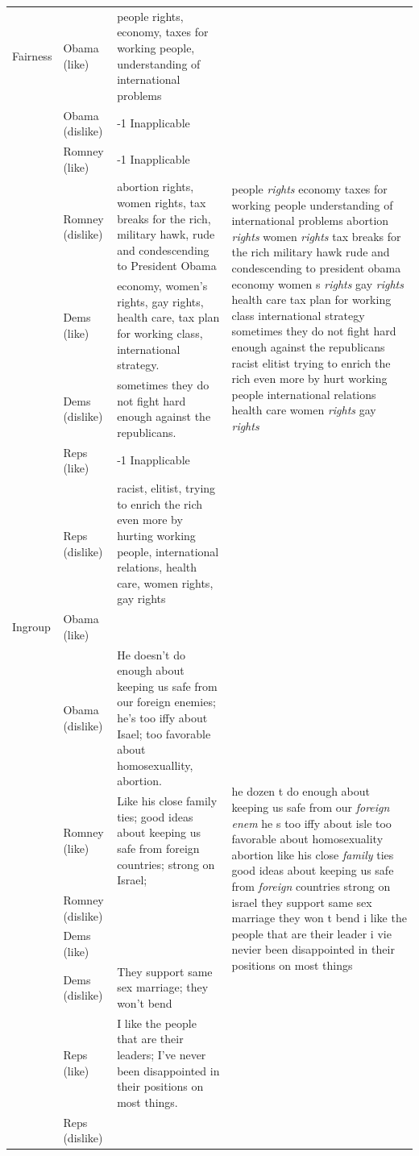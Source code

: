 \documentclass[12pt]{article}
\begin{document}
\begin{center}
\begin{longtable}{lp{1.5cm}p{5.5cm}p{5.5cm}}
	Fairness & Obama (like) & people rights, economy, taxes for working people, understanding of international problems & \multirow{8}{5.5cm}{people \textit{rights} economy taxes for working people understanding of international problems abortion \textit{rights} women \textit{rights} tax breaks for the rich military hawk rude and condescending to president obama economy women s \textit{rights} gay \textit{rights} health care tax plan for working class international strategy sometimes they do not fight hard enough against the republicans racist elitist trying to enrich the rich even more by hurt working people international relations health care women \textit{rights} gay \textit{rights}} \\
	 & Obama (dislike) & -1 Inapplicable \\
	 & Romney (like) & -1 Inapplicable \\
	 & Romney (dislike) & abortion rights, women rights, tax breaks for the rich, military hawk, rude and condescending to President Obama \\
	 & Dems (like) & economy, women's rights, gay rights, health care, tax plan for working class, international strategy. \\
	 & Dems (dislike) & sometimes they do not fight hard enough against the republicans. \\
	 & Reps (like) & -1 Inapplicable \\
	 & Reps (dislike) & racist, elitist, trying to enrich the rich even more by hurting working people, international relations, health care, women rights, gay rights \\ \hline	
	
	Ingroup & Obama (like) &  & \multirow{8}{5.5cm}{he dozen t do enough about keeping us safe from our \textit{foreign} \textit{enem} he s too iffy about isle too favorable about homosexuality abortion like his close \textit{family} ties good ideas about keeping us safe from \textit{foreign} countries strong on israel they support same sex marriage they won t bend i like the people that are their leader i vie nevier been disappointed in their positions on most things} \\
	 & Obama (dislike) & He doesn't do enough about keeping us safe from our foreign enemies; he's too iffy about Isael; too favorable about homosexuallity, abortion. \\
	 & Romney (like) & Like his close family ties; good ideas about keeping us safe from foreign countries; strong on Israel; \\
	 & Romney (dislike) &  \\
	 & Dems (like) &  \\
	 & Dems (dislike) & They support same sex marriage; they won't bend \\
	 & Reps (like) & I like the people that are their leaders; I've never been disappointed in their positions on most things. \\
	 & Reps (dislike) &  \\ \hline
	 

\end{longtable}
\end{center}
\end{document}
